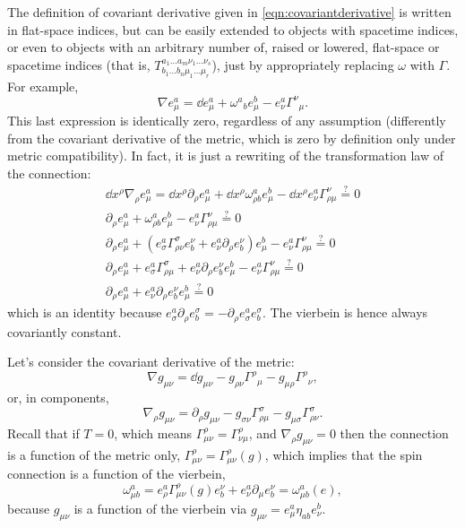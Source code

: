 \documentclass[a4paper,12pt]{book}
\begin{document}
The definition of covariant derivative given in \cref{eqn:covariantderivative} is written in flat-space indices, but can be easily extended to objects with spacetime indices, or even to objects with an arbitrary number of, raised or lowered, flat-space or spacetime indices (that is, $T^{a_1\ldots a_m\nu_1\ldots\nu_s}_{b_1\ldots b_n\mu_1\ldots\mu_r}$), just by appropriately replacing $\omega$ with $\Gamma$. For example,
\begin{equation}
\nabla e^a_\mu=\dd e^a_\mu+\omega^a{}_be^b_\mu-e^a_\nu\Gamma^\nu{}_\mu.
\label{eqn:nablavierbein}
\end{equation}
This last expression is identically zero, regardless of any assumption (differently from the covariant derivative of the metric, which is zero by definition only under metric compatibility). In fact, it is just a rewriting of the transformation law of the connection:
\begin{gather*}
\dd x^\rho\nabla_\rho e^a_\mu=\dd x^\rho\partial_\rho e^a_\mu+\dd x^\rho\omega_{\rho b}^ae^b_\mu-\dd x^\rho e^a_\nu\Gamma^\nu_{\rho\mu}\overset{?}{=}0\\
\partial_\rho e^a_\mu+\omega_{\rho b}^ae^b_\mu-e^a_\nu\Gamma^\nu_{\rho\mu}\overset{?}{=}0\\
\partial_\rho e^a_\mu+(e^a_\sigma\Gamma^\sigma_{\rho\nu}e^\nu_b+e^a_\nu\partial_\rho e^\nu_b)e^b_\mu-e^a_\nu\Gamma^\nu_{\rho\mu}\overset{?}{=}0\\
\partial_\rho e^a_\mu+e^a_\sigma\Gamma^\sigma_{\rho\mu}+e^a_\nu\partial_\rho e^\nu_be^b_\mu-e^a_\nu\Gamma^\nu_{\rho\mu}\overset{?}{=}0\\
\partial_\rho e^a_\mu+e^a_\nu\partial_\rho e^\nu_be^b_\mu\overset{?}{=}0
\end{gather*}
which is an identity because $e^a_\sigma\partial_\rho e^\sigma_b=-\partial_\rho e^a_\sigma e^\sigma_b$. The vierbein is hence always covariantly constant.

Let's consider the covariant derivative of the metric:
\[\nabla g_{\mu\nu}=\dd g_{\mu\nu}-g_{\rho\nu}\Gamma^\rho{}_\mu-g_{\mu\rho}\Gamma^\rho{}_\nu,\]
or, in components,
\[\nabla_\rho g_{\mu\nu}=\partial_\rho g_{\mu\nu}-g_{\sigma\nu}\Gamma^\sigma_{\rho\mu}-g_{\mu\sigma}\Gamma^\sigma_{\rho\nu}.\]
Recall that if $T=0$, which means $\Gamma_{\mu\nu}^\rho=\Gamma_{\nu\mu}^\rho$, and $\nabla_\rho g_{\mu\nu}=0$ then the connection is a function of the metric only, $\Gamma^\rho_{\mu\nu}=\Gamma^\rho_{\mu\nu}(g)$, which implies that the spin connection is a function of the vierbein,
\[\omega_{\mu b}^a=e^a_\rho\Gamma^\rho_{\mu\nu}(g)e^\nu_b+e^a_\nu\partial_\mu e^\nu_b=\omega_{\mu b}^a(e),\]
because $g_{\mu\nu}$ is a function of the vierbein via $g_{\mu\nu}=e^a_\mu\eta_{ab}e^b_\nu$.
\end{document}
